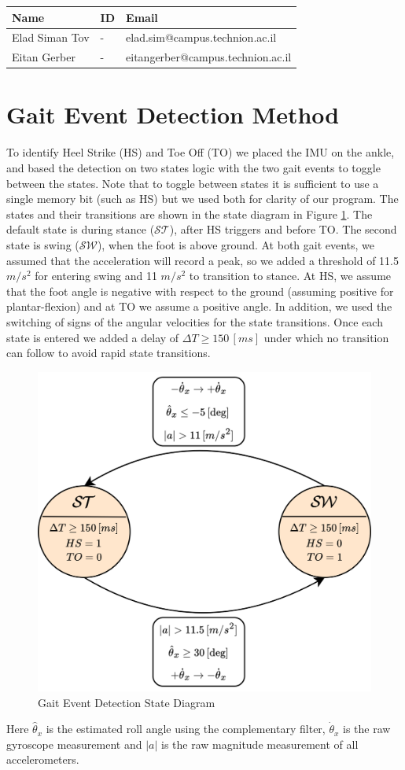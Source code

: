 \documentclass[10pt]{article}
\begin{document}
\begin{table}[h]
    \centering
    \begin{tabular}{l l l}
        \hline
        Name & ID & Email \\
        \hline
        Elad Siman Tov & - & elad.sim@campus.technion.ac.il \\
        \hline
        Eitan Gerber & - & eitangerber@campus.technion.ac.il \\
        \hline
    \end{tabular}
    \label{tab:personal_info}
\end{table}

\section{Gait Event Detection Method}
To identify Heel Strike (HS) and Toe Off (TO) we placed the IMU on the ankle, and based the detection on two states logic with the two gait events to toggle between the states. Note that to toggle between states it is sufficient to use a single memory bit (such as HS) but we used both for clarity of our program. The states and their transitions are shown in the state diagram in Figure \ref{fig:stateDiagram}.
The default state is during stance ($\mathcal{ST}$), after HS triggers and before TO. The second state is swing ($\mathcal{SW}$), when the foot is above ground.  
At both gait events, we assumed that the acceleration will record a peak, so we added a threshold of 11.5 $m/s^2$ for entering swing and 11 $m/s^2$ to transition to stance. At HS, we assume that the foot angle is negative with respect to the ground (assuming positive for plantar-flexion) and at TO we assume a positive angle. In addition, we used the switching of signs of the angular velocities for the state transitions. Once each state is entered we added a delay of $\Delta T\ge150\,[ms]$ under which no transition can follow to avoid rapid state transitions. 
\begin{figure}[H]
    \centering
    \includegraphics[width=0.5\linewidth]{stateDiagram.png}
    \caption{Gait Event Detection State Diagram}
    \label{fig:stateDiagram}
\end{figure}
Here $\hat \theta_x$ is the estimated roll angle using the complementary filter, $\dot \theta_x$ is the raw gyroscope measurement and $|a|$ is the raw magnitude measurement of all accelerometers.
\end{document}
